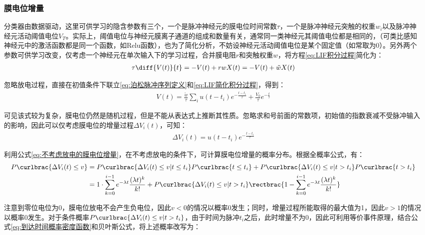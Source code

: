 \documentclass[11pt]{article}
\begin{document}
\subsubsection{膜电位增量}
分类器由数据驱动，这里可供学习的隐含参数有三个，一个是脉冲神经元的膜电位时间常数$\tau$，一个是脉冲神经元突触的权重$w_i$以及脉冲神经元活动阈值电位$V_T$。实际上，阈值电位与神经元膜离子通道的组成和数量有关，通常同一类神经元其阈值电位都是相同的，（可类比感知神经元中的激活函数都是同一个函数，如Relu函数），也为了简化分析，不妨设神经元活动阈值电位是某个固定值（如常取为0）。另外两个参数可供学习改变，仅考虑一个神经元在单次输入下的学习过程，合并膜电阻$r$和突触权重$w$，将方程\ref{eq:LIF积分过程}简化为：
\begin{align}
  \tau\diff{V(t)}{t}=-V(t)+rwX(t)=-V(t)+\tilde{w}X(t)
  \label{eq:LIF简化积分过程}
\end{align}\par
忽略放电过程，直接在初值条件下联立\ref{eq:泊松脉冲序列定义}和\ref{eq:LIF简化积分过程}，得到：
\begin{align}
  V(t)=\frac{\tilde{w}}{\tau}\sum\limits_{i}u(t-t_i)e^{-\frac{t-t_i}{\tau}}+\frac{V_0}{\tau}e^{-\frac{t}{\tau}}
\end{align}\par
可见该式较为复杂，膜电位仍然是随机过程，但是不能从表达式上推断其性质。忽略求和号前面的常数项，初始值的指数衰减不受脉冲输入的影响，因此可以仅考虑膜电位的增量过程$\Delta V_i(t)$，可知：
\begin{align}
  \Delta V_i(t)=u(t-t_i)e^{-\frac{t-t_i}{\tau}}
  \label{eq:不考虑放电的膜电位增量}
\end{align}\par
利用公式\ref{eq:不考虑放电的膜电位增量}，在不考虑放电的条件下，可计算膜电位增量的概率分布。根据全概率公式，有：
\begin{align}
  \begin{aligned}
    P\curlbrac{\Delta V_i(t)\le v} & =P\curlbrac{\Delta V_i(t)\le v|t\le t_i}P\curlbrac{t\le t_i}+P\curlbrac{\Delta V_i(t)\le v|t> t_i}P\curlbrac{t>t_i}                                                    \\
                                   & =1\cdot\sum_{k=0}^{i-1}e^{-\lambda t}\frac{(\lambda t)^k}{k!}+P\curlbrac{\Delta V_i(t)\le v|t> t_i}\rectbrac{1-\sum_{k=0}^{i-1}e^{-\lambda t}\frac{(\lambda t)^k}{k!}}
  \end{aligned}\label{eq:膜电位增量概率分布}
\end{align}\par
注意到零位电位为0，膜电位放电不会产生负电位，因此$v<0$的情况以概率0发生；同时，增量过程所能取得的最大值为1，因此$v>1$的情况以概率0发生。对于条件概率$P\curlbrac{\Delta V_i(t)\le v|t> t_i}$，由于时间为脉冲$t_i$之后，此时增量不为0，因此可利用等价事件原理，结合公式\ref{eq:到达时间概率密度函数}和贝叶斯公式，将上述概率改写为：
\end{document}
